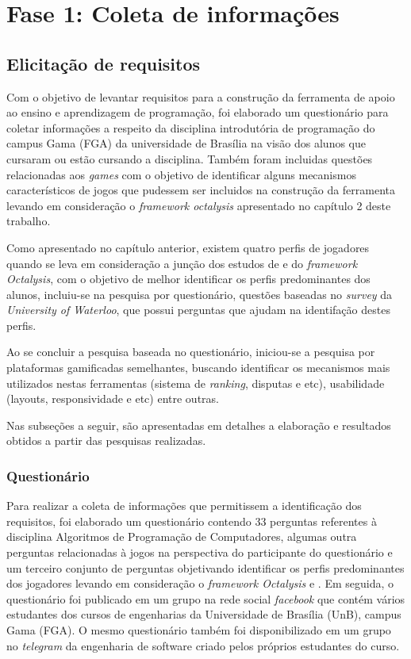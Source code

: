 \section{Fase 1: Coleta de informações }

\subsection{Elicitação de requisitos}
Com o objetivo de levantar requisitos para a construção da ferramenta de apoio ao ensino e aprendizagem de 
programação, foi elaborado um questionário para coletar informações a respeito da disciplina introdutória de programação 
do campus Gama (FGA) da universidade de Brasília na visão dos alunos que cursaram ou estão cursando a disciplina. Também 
foram incluidas  questões relacionadas aos \textit{games} com o objetivo de identificar alguns mecanismos característicos
de jogos que pudessem ser incluidos na construção da ferramenta levando em consideração o  \textit{framework octalysis}
apresentado no capítulo 2 deste trabalho.

Como apresentado no capítulo anterior, existem quatro perfis de jogadores quando se leva em consideração a junção dos estudos de  e do \textit{framework Octalysis},
com o objetivo de melhor identificar os perfis predominantes dos alunos, incluiu-se na pesquisa por questionário, questões baseadas no \textit{survey}
da \textit{University of Waterloo}, que possui perguntas que ajudam na identifação destes perfis.

Ao se concluir a pesquisa baseada no questionário, iniciou-se a pesquisa por plataformas gamificadas semelhantes, buscando
identificar os mecanismos mais utilizados nestas ferramentas (sistema de \textit{ranking}, disputas e etc), usabilidade (layouts, responsividade e etc) entre outras.

Nas subseções a seguir, são apresentadas em detalhes a elaboração e resultados obtidos a partir das pesquisas realizadas.

\subsubsection{Questionário}
Para realizar a coleta de informações que permitissem a identificação dos requisitos, foi elaborado um questionário 
contendo 33 perguntas referentes à disciplina Algoritmos de Programação de Computadores, algumas outra perguntas
relacionadas à jogos na perspectiva do participante do questionário e um terceiro conjunto de perguntas objetivando identificar 
os perfis predominantes dos jogadores levando em consideração o \textit{framework Octalysis} e . 
Em seguida, o questionário foi publicado em um grupo na rede social \textit{facebook} que contém
vários estudantes dos cursos de engenharias da Universidade de Brasília (UnB), campus Gama (FGA). O mesmo questionário
também foi disponibilizado em um grupo no \textit{telegram} da engenharia de software criado pelos próprios estudantes do
curso. 

